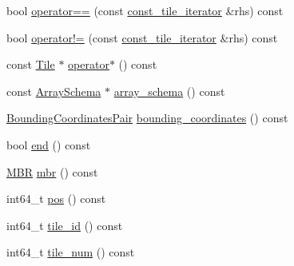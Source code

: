 \begin{DoxyCompactItemize}
\item 
bool \hyperlink{classStorageManager_1_1Fragment_1_1const__tile__iterator_aa4a1e370f185ed9287229d110afa2a74}{operator==} (const \hyperlink{classStorageManager_1_1Fragment_1_1const__tile__iterator}{const\+\_\+tile\+\_\+iterator} \&rhs) const 
\item 
bool \hyperlink{classStorageManager_1_1Fragment_1_1const__tile__iterator_ad8fb0aa74d0f622ac5aa067bc959a836}{operator!=} (const \hyperlink{classStorageManager_1_1Fragment_1_1const__tile__iterator}{const\+\_\+tile\+\_\+iterator} \&rhs) const 
\item 
const \hyperlink{classTile}{Tile} $\ast$ \hyperlink{classStorageManager_1_1Fragment_1_1const__tile__iterator_acba2b0a1ddaa3eeea0ae201726407046}{operator$\ast$} () const 
\item 
const \hyperlink{classArraySchema}{Array\+Schema} $\ast$ \hyperlink{classStorageManager_1_1Fragment_1_1const__tile__iterator_a0f9f6c91e5385650562fd5811eba8ec6}{array\+\_\+schema} () const 
\item 
\hyperlink{classStorageManager_a2b31e8ccd7a9daa2cf5f9fbf12080667}{Bounding\+Coordinates\+Pair} \hyperlink{classStorageManager_1_1Fragment_1_1const__tile__iterator_a5012591b77d96a0e93743851c6c7825c}{bounding\+\_\+coordinates} () const 
\item 
bool \hyperlink{classStorageManager_1_1Fragment_1_1const__tile__iterator_af014586805d403eb49fe9770fd0bca45}{end} () const 
\item 
\hyperlink{classStorageManager_abb895595763203bac1236a1e5886ae91}{M\+B\+R} \hyperlink{classStorageManager_1_1Fragment_1_1const__tile__iterator_ab7d19fcd42b84b14f16304909ed76bc0}{mbr} () const 
\item 
int64\+\_\+t \hyperlink{classStorageManager_1_1Fragment_1_1const__tile__iterator_ac04a30e821b2046970f3ed6b6f5154be}{pos} () const 
\item 
int64\+\_\+t \hyperlink{classStorageManager_1_1Fragment_1_1const__tile__iterator_afdf6ab248d191ea0c3e854723d80275b}{tile\+\_\+id} () const 
\item 
int64\+\_\+t \hyperlink{classStorageManager_1_1Fragment_1_1const__tile__iterator_ab136e68e5102f701c820d796c36713f0}{tile\+\_\+num} () const 
\end{DoxyCompactItemize}
